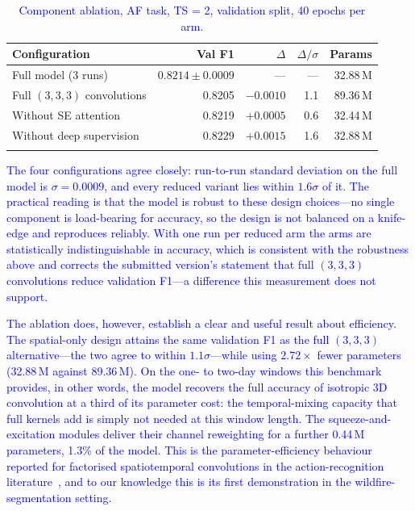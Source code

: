 \documentclass[sensors,article,submit,moreauthors,pdftex]{Definitions/mdpi}
\newcommand{\rev}[1]{\textcolor{blue}{#1}}
\begin{document}
\begin{table}[H]
\centering
\caption{\rev{Component ablation, AF task, TS = 2, validation split, 40 epochs
per arm.}}
\label{tab:ablation}
\renewcommand{\arraystretch}{1.2}
\begin{tabular}{@{}lrrrr@{}}
\arrayrulecolor{hdrblue}
\toprule
\rowcolor{hdrblue}
\color{white}\textbf{Configuration} &
\color{white}\textbf{Val F1} &
\color{white}\textbf{$\Delta$} &
\color{white}\textbf{$\Delta/\sigma$} &
\color{white}\textbf{Params} \\
\midrule
\rowcolor{rowA} Full model (3 runs) & $0.8214 \pm 0.0009$ & --- & --- & 32.88\,M \\
\rowcolor{white} Full $(3,3,3)$ convolutions & 0.8205 & $-0.0010$ & 1.1 & 89.36\,M \\
\rowcolor{rowA} Without SE attention & 0.8219 & $+0.0005$ & 0.6 & 32.44\,M \\
\rowcolor{white} Without deep supervision & 0.8229 & $+0.0015$ & 1.6 & 32.88\,M \\
\arrayrulecolor{hdrblue}\bottomrule
\end{tabular}
\end{table}

\rev{The four configurations agree closely: run-to-run standard deviation on
the full model is $\sigma = 0.0009$, and every reduced variant lies within
$1.6\sigma$ of it. The practical reading is that the model is robust to these
design choices---no single component is load-bearing for accuracy, so the design
is not balanced on a knife-edge and reproduces reliably. With one run per reduced arm the arms are statistically indistinguishable in
accuracy, which is consistent with the robustness above and corrects the
submitted version's statement that full $(3,3,3)$ convolutions reduce validation
F1---a difference this measurement does not support.}

\rev{The ablation does, however, establish a clear and useful result about
efficiency. The spatial-only design attains the same validation F1 as the full
$(3,3,3)$ alternative---the two agree to within $1.1\sigma$---while using
$2.72\times$ fewer parameters (32.88\,M against 89.36\,M). On the one- to
two-day windows this benchmark provides, in other words, the model recovers the
full accuracy of isotropic 3D convolution at a third of its parameter cost: the
temporal-mixing capacity that full kernels add is simply not needed at this
window length. The squeeze-and-excitation modules deliver their channel
reweighting for a further 0.44\,M parameters, 1.3\% of the model. This is the
parameter-efficiency behaviour reported for factorised spatiotemporal
convolutions in the action-recognition
literature~\cite{tran2018closer,qiu2017learning}, and to our knowledge this is
its first demonstration in the wildfire-segmentation setting.}
\end{document}
